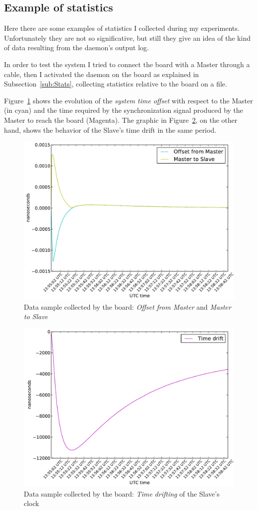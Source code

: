 \subsection{ Example of statistics }

    Here there are some examples of statistics I collected during my
    experiments. Unfortunately they are not so significative, but still
    they give an idea of the kind of data resulting from the daemon's
    output log.

    In order to test the system I tried to connect the board with a Master
    through a  cable, then I activated the daemon on the
    board as explained in Subsection~\ref{sub:Stats}, collecting
    statistics relative to the board on a file.

    Figure~\ref{img:OFM-MTS} shows the evolution of the \emph{system time
    offset} with respect to the Master (in cyan) and the time required by
    the synchronization signal produced by the Master to reach the board
    (Magenta). The graphic in Figure~\ref{img:TimeDrift}, on the other
    hand, shows the behavior of the Slave's time drift in the same period.

    \begin{figure}[p]
        \centering
        \includegraphics[width=.8\textwidth]{pics/figure01}
        \caption{Data sample collected by the board: \emph{Offset from
                 Master} and \emph{Master to Slave}}
        \label{img:OFM-MTS}
    \end{figure}

    \begin{figure}[p]
        \centering
        \includegraphics[width=.8\textwidth]{pics/figure02}
        \caption{Data sample collected by the board: \emph{Time drifting}
                 of the Slave's clock}
        \label{img:TimeDrift}
    \end{figure}


